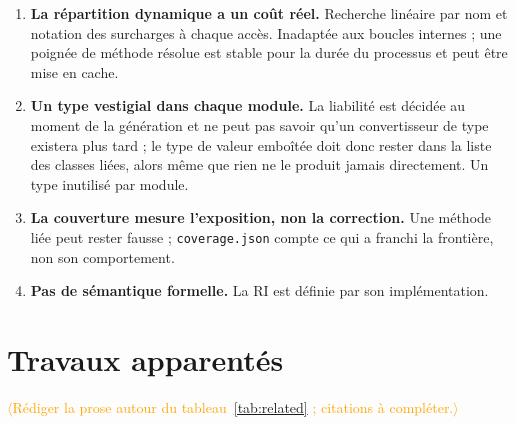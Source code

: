 \documentclass[11pt,a4paper]{article}
\newcommand{\gap}[1]{\textcolor{orange}{\textsf{\small$\langle$#1$\rangle$}}}
\newcommand{\code}[1]{\texttt{\small #1}}
\begin{document}
\begin{enumerate}
    par classe, et le bras scriptable émet \emph{plus} de code au total que le
    bras statique à toutes les tailles mesurées (section~\ref{sec:e2}). Ce qui
    est constant, c'est la liaison, son manifeste et son temps de génération ---
    pas la chaîne.
  \item \textbf{La répartition dynamique a un coût réel.} Recherche linéaire par
    nom et notation des surcharges à chaque accès. Inadaptée aux boucles
    internes ; une poignée de méthode résolue est stable pour la durée du
    processus et peut être mise en cache.
  \item \textbf{Un type vestigial dans chaque module.} La liabilité est décidée
    au moment de la génération et ne peut pas savoir qu'un convertisseur de type
    existera plus tard ; le type de valeur emboîtée doit donc rester dans la
    liste des classes liées, alors même que rien ne le produit jamais
    directement. Un type inutilisé par module.
  \item \textbf{La couverture mesure l'exposition, non la correction.} Une
    méthode liée peut rester fausse ; \code{coverage.json} compte ce qui a
    franchi la frontière, non son comportement.
  \item \textbf{Pas de sémantique formelle.} La RI est définie par son
    implémentation.
\end{enumerate}

\section{Travaux apparentés}
\label{sec:related}

\gap{Rédiger la prose autour du tableau~\ref{tab:related} ; citations à compléter.}
\end{document}
